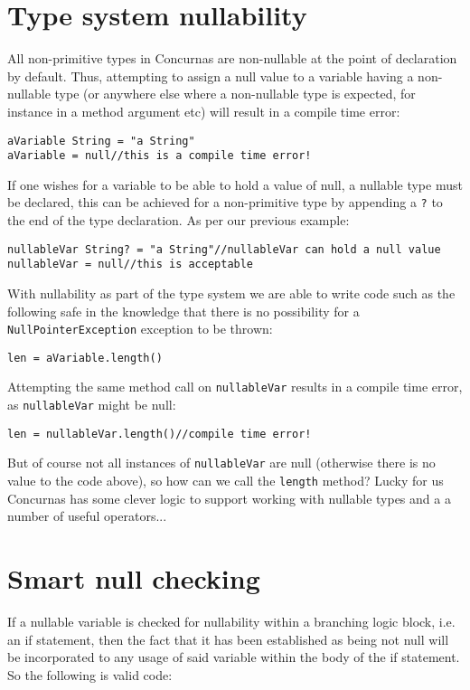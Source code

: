 \documentclass[conc-doc]{subfiles}
\begin{document}
\section{Type system nullability}
All non-primitive types in Concurnas are non-nullable at the point of declaration by default. Thus, attempting to assign a null value to a variable having a non-nullable type (or anywhere else where a non-nullable type is expected, for instance in a method argument etc) will result in a compile time error:

\begin{lstlisting}
aVariable String = "a String"
aVariable = null//this is a compile time error!
\end{lstlisting}

If one wishes for a variable to be able to hold a value of null, a nullable type must be declared, this can be achieved for a non-primitive type by appending a \lstinline{?} to the end of the type declaration. As per our previous example:

\begin{lstlisting}
nullableVar String? = "a String"//nullableVar can hold a null value
nullableVar = null//this is acceptable
\end{lstlisting}

With nullability as part of the type system we are able to write code such as the following safe in the knowledge that there is no possibility for a \lstinline{NullPointerException} exception to be thrown:

\begin{lstlisting}
len = aVariable.length()
\end{lstlisting}

Attempting the same method call on \lstinline{nullableVar} results in a compile time error, as \lstinline{nullableVar} might be null:

\begin{lstlisting}
len = nullableVar.length()//compile time error!
\end{lstlisting}

But of course not all instances of \lstinline{nullableVar} are null (otherwise there is no value to the code above), so how can we call the \lstinline{length} method? Lucky for us Concurnas has some clever logic to support working with nullable types and a a number of useful operators...

\section{Smart null checking}
If a nullable variable is checked for nullability within a branching logic block, i.e. an if statement, then the fact that it has been established as being not null will be incorporated to any usage of said variable within the body of the if statement. So the following is valid code:
\end{document}
